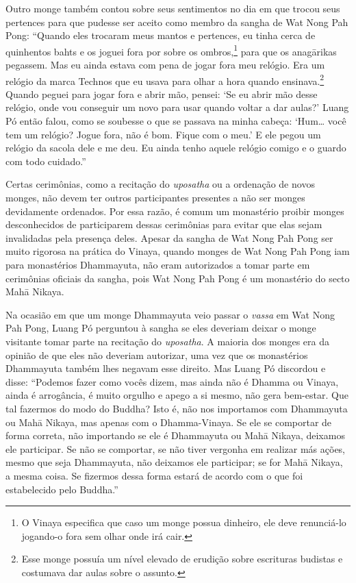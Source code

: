 Outro monge também contou sobre seus sentimentos no dia em que trocou
seus pertences para que pudesse ser aceito como membro da sangha de Wat
Nong Pah Pong: ``Quando eles trocaram meus mantos e pertences, eu tinha
cerca de quinhentos bahts e os joguei fora por sobre os ombros,\footnote{O
  Vinaya especifica que caso um monge possua dinheiro, ele deve
  renunciá-lo jogando-o fora sem olhar onde irá cair.} para que os
anagārikas pegassem. Mas eu ainda estava com pena de jogar fora meu
relógio. Era um relógio da marca Technos que eu usava para olhar a hora
quando ensinava.\footnote{Esse monge possuía um nível elevado de erudição
  sobre escrituras budistas e costumava dar aulas sobre o assunto.}
Quando peguei para jogar fora e abrir mão, pensei: `Se eu abrir mão
desse relógio, onde vou conseguir um novo para usar quando voltar a dar
aulas?' Luang Pó então falou, como se soubesse o que se passava na minha
cabeça: `Hum\ldots{} você tem um relógio? Jogue fora, não é bom. Fique
com o meu.' E ele pegou um relógio da sacola dele e me deu. Eu ainda
tenho aquele relógio comigo e o guardo com todo cuidado.''

Certas cerimônias, como a recitação do \emph{uposatha} ou a ordenação de
novos monges, não devem ter outros participantes presentes a não ser
monges devidamente ordenados. Por essa razão, é comum um monastério
proibir monges desconhecidos de participarem dessas cerimônias para
evitar que elas sejam invalidadas pela presença deles. Apesar da sangha
de Wat Nong Pah Pong ser muito rigorosa na prática do Vinaya, quando
monges de Wat Nong Pah Pong iam para monastérios Dhammayuta, não eram
autorizados a tomar parte em cerimônias oficiais da sangha, pois Wat
Nong Pah Pong é um monastério do secto Mahā Nikaya.

Na ocasião em que um monge Dhammayuta veio passar o \emph{vassa} em Wat
Nong Pah Pong, Luang Pó perguntou à sangha se eles deveriam deixar o
monge visitante tomar parte na recitação do \emph{uposatha}. A maioria
dos monges era da opinião de que eles não deveriam autorizar, uma vez
que os monastérios Dhammayuta também lhes negavam esse direito. Mas
Luang Pó discordou e disse: ``Podemos fazer como vocês dizem, mas ainda
não é Dhamma ou Vinaya, ainda é arrogância, é muito orgulho e apego a si
mesmo, não gera bem-estar. Que tal fazermos do modo do Buddha? Isto é,
não nos importamos com Dhammayuta ou Mahā Nikaya, mas apenas com o
Dhamma-Vinaya. Se ele se comportar de forma correta, não importando se
ele é Dhammayuta ou Mahā Nikaya, deixamos ele participar. Se não se
comportar, se não tiver vergonha em realizar más ações, mesmo que seja
Dhammayuta, não deixamos ele participar; se for Mahā Nikaya, a mesma
coisa. Se fizermos dessa forma estará de acordo com o que foi
estabelecido pelo Buddha.''

